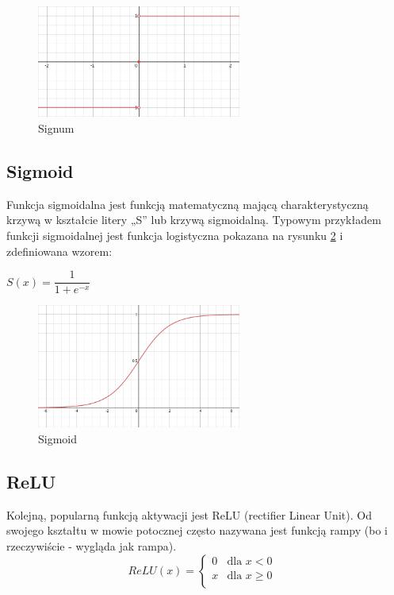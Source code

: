 \documentclass{article}
\begin{document}
\begin{figure}[H]
	\centering
	\includegraphics[width=0.6\textwidth,keepaspectratio=true]{Signum}
	\caption{
		Signum
	}
	\label{Signum}
\end{figure}


\subsection{Sigmoid}
Funkcja sigmoidalna jest funkcją matematyczną mającą charakterystyczną krzywą w kształcie litery „S” lub krzywą sigmoidalną.
Typowym przykładem funkcji sigmoidalnej jest funkcja logistyczna pokazana na rysunku \ref{Sigmoid} i zdefiniowana wzorem: 

$S(x) = \dfrac{1}{1 + e^{-x}}$

\begin{figure}[H]
	\centering
	\includegraphics[width=0.6\textwidth,keepaspectratio=true]{Sigmoid}
	\caption{
		Sigmoid
	}
	\label{Sigmoid}
\end{figure}

\subsection{ReLU}
Kolejną, popularną funkcją aktywacji jest ReLU (rectifier Linear Unit). Od swojego kształtu w mowie potocznej często nazywana jest funkcją rampy (bo i rzeczywiście - wygląda jak rampa).
\begin{equation}
	ReLU(x) = 
	\begin{cases}
		0 & \text{dla $x < 0$}\\
		x & \text{dla $x \geqslant 0$ }\\
	\end{cases}    
\end{equation}
\end{document}
